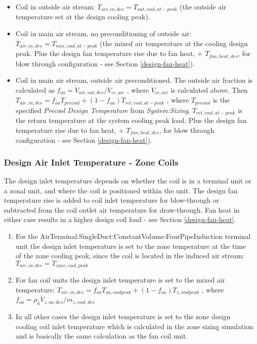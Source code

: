 \begin{itemize}
\item
  Coil in outside air stream: \(T_{air,in,des} = T_{out,cool,at-peak}\) (the outside air temperature set at the design cooling peak).
\item
  Coil in main air stream, no preconditioning of outside air: \(T_{air,in,des} = T_{mix,cool,at-peak}\) (the mixed air temperature at the cooling design peak. Plus the design fan temperature rise due to fan heat, + \(T_{fan,heat,des}\), for blow through configuration - see Section \ref{design-fan-heat}).
\item
  Coil in main air stream, outside air preconditioned. The outside air fraction is calculated as \(f_{oa} = \dot V_{air,out,des}/\dot V_{cc,air}\) , where \(\dot V_{cc,air}\) is calculated above. Then \(T_{air,in,des} = f_{oa}T_{precool}+\left(1-f_{oa}\right)T_{ret,cool,at-peak}\) , where \(T_{precool}\) is the specified \emph{Precool Design Temperature} from \emph{System:Sizing}, \(T_{ret,cool,at-peak}\) is the return temperature at the system cooling peak load. Plus the design fan temperature rise due to fan heat, + \(T_{fan,heat,des}\), for blow through configuration - see Section \ref{design-fan-heat}).
\end{itemize}

\subsubsection{Design Air Inlet Temperature - Zone Coils}\label{design-air-inlet-temperature---zone-coils}

The design inlet temperature depends on whether the coil is in a terminal unit or a zonal unit, and where the coil is positioned within the unit. The design fan temperature rise is added to coil inlet temperature for blow-through or subtracted from the coil outlet air temperature for draw-through. Fan heat in either case results in a higher design coil load - see Section \ref{design-fan-heat}.  

\begin{enumerate}
\def\labelenumi{\arabic{enumi}.}
\item
  For the AirTerminal:SingleDuct:ConstantVolume:FourPipeInduction terminal unit the design inlet temperature is set to the zone temperature at the time of the zone cooling peak, since the coil is located in the induced air stream: \(T_{air,in,des} = T_{zone,cool,peak}\)
\item
  For fan coil units the design inlet temperature is set to the mixed air temperature: \(T_{air,in,des} = f_{oa}T_{oa,coolpeak} + \left(1-f_{oa}\right)T_{z,coolpeak}\) , where \(f_{oa} = \rho_a \dot V_{z,oa,des} / \dot m_{z,cool,des}\)
\item
  In all other cases the design inlet temperature is set to the zone design cooling coil inlet temperature which is calculated in the zone sizing simulation and is basically the same calculation as the fan coil unit.
\end{enumerate}

